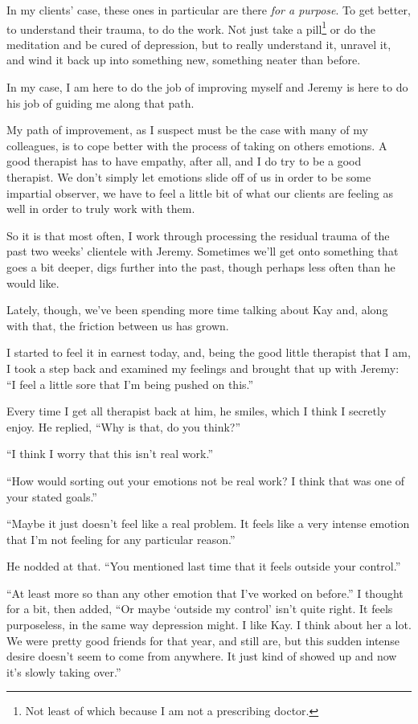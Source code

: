 In my clients' case, these ones in particular are there \emph{for a purpose}. To get better, to understand their trauma, to do the work. Not just take a pill\footnote{Not least of which because I am not a prescribing doctor.} or do the meditation and be cured of depression, but to really understand it, unravel it, and wind it back up into something new, something neater than before.

In my case, I am here to do the job of improving myself and Jeremy is here to do his job of guiding me along that path.

My path of improvement, as I suspect must be the case with many of my colleagues, is to cope better with the process of taking on others emotions. A good therapist has to have empathy, after all, and I do try to be a good therapist. We don't simply let emotions slide off of us in order to be some impartial observer, we have to feel a little bit of what our clients are feeling as well in order to truly work with them.

So it is that most often, I work through processing the residual trauma of the past two weeks' clientele with Jeremy. Sometimes we'll get onto something that goes a bit deeper, digs further into the past, though perhaps less often than he would like.

Lately, though, we've been spending more time talking about Kay and, along with that, the friction between us has grown.

I started to feel it in earnest today, and, being the good little therapist that I am, I took a step back and examined my feelings and brought that up with Jeremy: ``I feel a little sore that I'm being pushed on this.''

Every time I get all therapist back at him, he smiles, which I think I secretly enjoy. He replied, ``Why is that, do you think?''

``I think I worry that this isn't real work.''

``How would sorting out your emotions not be real work? I think that was one of your stated goals.''

``Maybe it just doesn't feel like a real problem. It feels like a very intense emotion that I'm not feeling for any particular reason.''

He nodded at that. ``You mentioned last time that it feels outside your control.''

``At least more so than any other emotion that I've worked on before.'' I thought for a bit, then added, ``Or maybe `outside my control' isn't quite right. It feels purposeless, in the same way depression might. I like Kay. I think about her a lot. We were pretty good friends for that year, and still are, but this sudden intense desire doesn't seem to come from anywhere. It just kind of showed up and now it's slowly taking over.''

